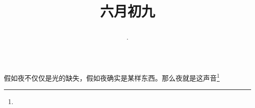 \title{\date[d=14,m=7,y=2024][year:cn-y,年,month:cn,day:cn,日,·,weekday]·六月初九 }
假如夜不仅仅是光的缺失，假如夜确实是某样东西。那么夜就是这声音\footnote{ }

